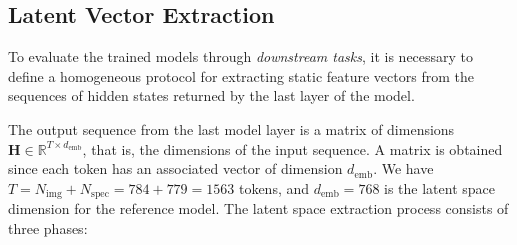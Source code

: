 \subsection{Latent Vector Extraction} \label{sec:dev:extraction}

To evaluate the trained models through \textit{downstream tasks}, it is necessary to define a homogeneous protocol for extracting static feature vectors from the sequences of hidden states returned by the last layer of the model.

The output sequence from the last model layer is a matrix of dimensions $\mathbf{H} \in \mathbb{R}^{T \times d_{\text{emb}}}$, that is, the dimensions of the input sequence. A matrix is obtained since each token has an associated vector of dimension $d_{\text{emb}}$. We have $T = N_{\text{img}} + N_{\text{spec}} = 784 + 779 = 1563$ tokens, and $d_{\text{emb}} = 768$ is the latent space dimension for the reference model. The latent space extraction process consists of three phases:

